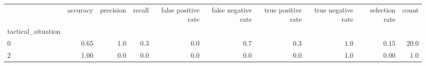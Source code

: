 \begin{tabular}{lrrrrrrrrr}
\toprule
{} &  accuracy &  precision &  recall &  false positive rate &  false negative rate &  true positive rate &  true negative rate &  selection rate &  count \\
tactical\_situation &           &            &         &                      &                      &                     &                     &                 &        \\
\midrule
0                  &      0.65 &        1.0 &     0.3 &                  0.0 &                  0.7 &                 0.3 &                 1.0 &            0.15 &   20.0 \\
2                  &      1.00 &        0.0 &     0.0 &                  0.0 &                  0.0 &                 0.0 &                 1.0 &            0.00 &    1.0 \\
\bottomrule
\end{tabular}
